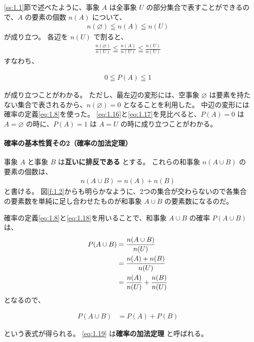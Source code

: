 \documentclass[12pt]{ltjsarticle}\usepackage{ifthen}\newcounter{enlarge}\setcounter{enlarge}{1}
\begin{document}
\ref{ss:1.1}節で述べたように、事象 $A$ は全事象 $U$ の部分集合で表すことができるので、$A$ の要素の個数 $n(A)$ について、
\begin{align}
  n(\varnothing) \leqq n(A) \leqq n(U) \label{eq:1.14}
\end{align}
が成り立つ。
各辺を $n(U)$ で割ると、
\begin{align}
  \frac{n(\varnothing)}{n(U)} \leqq \frac{n(A)}{n(U)} \leqq \frac{n(U)}{n(U)} \label{eq:1.16}
\end{align}
すなわち、
\begin{oframed}
\begin{align}
  0 \leqq P(A) \leqq 1 \label{eq:1.17}
\end{align}
\end{oframed}
\noindent
が成り立つことがわかる。
ただし、最左辺の変形には、空事象 $\varnothing$ は要素を持たない集合で表されるから、$n(\varnothing) = 0$ となることを利用した。
中辺の変形には確率の定義\eqref{eq:1.8}を使った。
\eqref{eq:1.16}と\eqref{eq:1.17}を見比べると、$P(A) = 0$ は $A = \varnothing$ の時に、$P(A) = 1$ は $A = U$ の時に成り立つことがわかる。

\paragraph{確率の基本性質その2（確率の加法定理）}

事象 $A$ と事象 $B$ は\textbf{互いに排反である} とする。
これらの和事象 $n(A \cup B)$ の要素の個数は、
\begin{align}
  n(A \cup B) = n(A) + n(B) \label{eq:1.18}
\end{align}
と書ける。
図\ref{f:1.2}からも明らかなように、2つの集合が交わらないので各集合の要素数を単純に足し合わせたものが和事象 $A \cup B$ の要素数になるのだ。

確率の定義\eqref{eq:1.8}と\eqref{eq:1.18}を用いることで、和事象 $A \cup B$ の確率 $P(A \cup B)$ は、
\begin{align}
  P(A \cup B) &= \frac{n(A \cup B)}{n(U)} \notag \\
              &= \frac{n(A) + n(B)}{n(U)} \notag \\
              &= \frac{n(A)}{n(U)} + \frac{n(B)}{n(U)} 
\end{align}
となるので、
\begin{oframed}
  \begin{align}
    P(A \cup B) &= P(A) + P(B) \label{eq:1.19}
  \end{align}
\end{oframed}
\noindent
という表式が得られる。
\eqref{eq:1.19} は\textbf{確率の加法定理} と呼ばれる。
\end{document}
